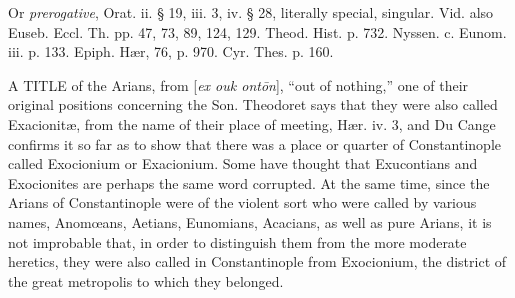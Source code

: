 \xsection{[Exaireton]}

Or \emph{prerogative}, Orat. ii. § 19, iii. 3,
iv. § 28, literally special, singular. Vid. also Euseb. Eccl. Th. pp.
47, 73, 89, 124, 129. Theod. Hist. p. 732. Nyssen. c. Eunom. iii. p.
133. Epiph. Hær, 76, p. 970. Cyr. Thes. p. 160.


A TITLE
of the Arians, from [\emph{ex ouk ont\={o}n}], “out of
nothing,” one of their original positions concerning the Son.
Theodoret says that they were also called Exacionitæ, from the name
of their place of meeting, Hær. iv. 3, and Du Cange confirms it so
far as to show that there was a place or quarter of Constantinople
called Exocionium or Exacionium. Some have thought that Exucontians
and Exocionites are perhaps the same word corrupted. At the same time,
since the Arians of Constantinople were of the violent sort who were
called by various names, Anomœans, Aetians, Eunomians, Acacians, as
well as pure Arians, it is not improbable that, in order to
distinguish them from the more moderate heretics, they were also
called in Constantinople from Exocionium, the district of the great
metropolis to which they belonged.

\xsection{[Epinoia]}

